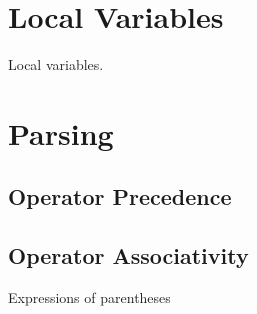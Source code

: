 

\section{Local Variables}
\csharpsubsection{\csharp}

\begin{syntaxfloat}
  
  \caption{Local variables.}
  \label{syntax:prim:vars:locals}
\end{syntaxfloat}


\section{Parsing}
\subsection{Operator Precedence}


\subsection{Operator Associativity}

\csharpsubsection{\csharp}

\begin{syntaxfloat}
  
  \caption{Expressions of parentheses}
  \label{syntax:prim:pars}
\end{syntaxfloat}


